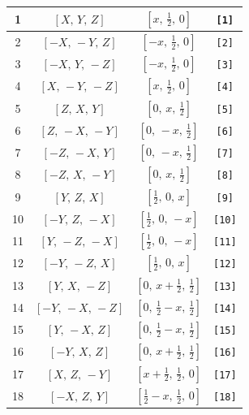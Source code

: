 \documentclass[fleqn,8pt]{jsarticle}
\begin{document}
\begin{longtable}{cccc}
1 & $\left[ X,\, Y,\, Z \right]$ & $\left[ x,\, \frac{1}{2},\, 0 \right]$ & {\tt [1]} \\ \hline
2 & $\left[ - X,\, - Y,\, Z \right]$ & $\left[ - x,\, \frac{1}{2},\, 0 \right]$ & {\tt [2]} \\ \hline
3 & $\left[ - X,\, Y,\, - Z \right]$ & $\left[ - x,\, \frac{1}{2},\, 0 \right]$ & {\tt [3]} \\ \hline
4 & $\left[ X,\, - Y,\, - Z \right]$ & $\left[ x,\, \frac{1}{2},\, 0 \right]$ & {\tt [4]} \\ \hline
5 & $\left[ Z,\, X,\, Y \right]$ & $\left[ 0,\, x,\, \frac{1}{2} \right]$ & {\tt [5]} \\ \hline
6 & $\left[ Z,\, - X,\, - Y \right]$ & $\left[ 0,\, - x,\, \frac{1}{2} \right]$ & {\tt [6]} \\ \hline
7 & $\left[ - Z,\, - X,\, Y \right]$ & $\left[ 0,\, - x,\, \frac{1}{2} \right]$ & {\tt [7]} \\ \hline
8 & $\left[ - Z,\, X,\, - Y \right]$ & $\left[ 0,\, x,\, \frac{1}{2} \right]$ & {\tt [8]} \\ \hline
9 & $\left[ Y,\, Z,\, X \right]$ & $\left[ \frac{1}{2},\, 0,\, x \right]$ & {\tt [9]} \\ \hline
10 & $\left[ - Y,\, Z,\, - X \right]$ & $\left[ \frac{1}{2},\, 0,\, - x \right]$ & {\tt [10]} \\ \hline
11 & $\left[ Y,\, - Z,\, - X \right]$ & $\left[ \frac{1}{2},\, 0,\, - x \right]$ & {\tt [11]} \\ \hline
12 & $\left[ - Y,\, - Z,\, X \right]$ & $\left[ \frac{1}{2},\, 0,\, x \right]$ & {\tt [12]} \\ \hline
13 & $\left[ Y,\, X,\, - Z \right]$ & $\left[ 0,\, x + \frac{1}{2},\, \frac{1}{2} \right]$ & {\tt [13]} \\ \hline
14 & $\left[ - Y,\, - X,\, - Z \right]$ & $\left[ 0,\, \frac{1}{2} - x,\, \frac{1}{2} \right]$ & {\tt [14]} \\ \hline
15 & $\left[ Y,\, - X,\, Z \right]$ & $\left[ 0,\, \frac{1}{2} - x,\, \frac{1}{2} \right]$ & {\tt [15]} \\ \hline
16 & $\left[ - Y,\, X,\, Z \right]$ & $\left[ 0,\, x + \frac{1}{2},\, \frac{1}{2} \right]$ & {\tt [16]} \\ \hline
17 & $\left[ X,\, Z,\, - Y \right]$ & $\left[ x + \frac{1}{2},\, \frac{1}{2},\, 0 \right]$ & {\tt [17]} \\ \hline
18 & $\left[ - X,\, Z,\, Y \right]$ & $\left[ \frac{1}{2} - x,\, \frac{1}{2},\, 0 \right]$ & {\tt [18]} \\ \hline

\end{longtable}
\end{document}
